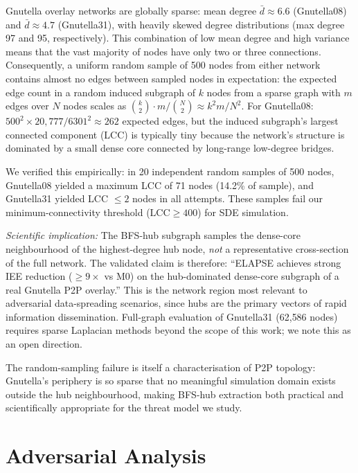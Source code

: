 \documentclass[review,12pt]{elsarticle}
\begin{document}
Gnutella overlay networks are globally sparse: mean degree $\bar{d} \approx 6.6$
(Gnutella08) and $\bar{d} \approx 4.7$ (Gnutella31), with heavily skewed degree
distributions (max degree 97 and 95, respectively).
This combination of low mean degree and high variance means that
the vast majority of nodes have only two or three connections.
Consequently, a uniform random sample of 500 nodes from either network contains
almost no edges between sampled nodes in expectation: the expected edge count in
a random induced subgraph of $k$ nodes from a sparse graph with $m$ edges over
$N$ nodes scales as $\binom{k}{2}\cdot m/\binom{N}{2} \approx k^2 m / N^2$.
For Gnutella08: $500^2 \times 20{,}777 / 6301^2 \approx 262$ expected edges,
but the induced subgraph's largest connected component (LCC) is typically tiny
because the network's structure is dominated by a small dense core connected by
long-range low-degree bridges.

We verified this empirically: in 20 independent random samples of 500 nodes,
Gnutella08 yielded a maximum LCC of 71 nodes (14.2\% of sample),
and Gnutella31 yielded LCC $\leq 2$ nodes in all attempts.
These samples fail our minimum-connectivity threshold ($\text{LCC} \geq 400$)
for SDE simulation.

\emph{Scientific implication:} The BFS-hub subgraph samples the dense-core
neighbourhood of the highest-degree hub node, \emph{not} a representative
cross-section of the full network.  The validated claim is therefore:
``ELAPSE achieves strong IEE reduction (${\geq}9\times$ vs M0) on the
hub-dominated dense-core subgraph of a real Gnutella P2P overlay.''
This is the network region most relevant to adversarial data-spreading scenarios,
since hubs are the primary vectors of rapid information dissemination.
Full-graph evaluation of Gnutella31 (62{,}586 nodes) requires sparse Laplacian
methods beyond the scope of this work; we note this as an open direction.

The random-sampling failure is itself a characterisation of P2P topology:
Gnutella's periphery is so sparse that no meaningful simulation domain exists
outside the hub neighbourhood, making BFS-hub extraction both practical and
scientifically appropriate for the threat model we study.

\section{Adversarial Analysis}
\label{sec:adversarial}
\end{document}
